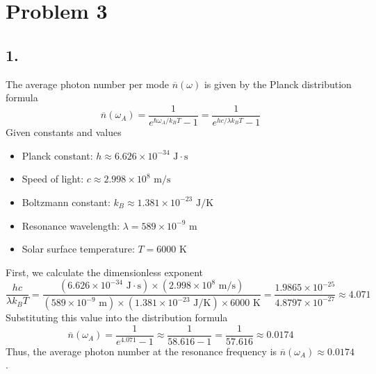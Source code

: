 \documentclass[11pt,a4paper]{article}
\begin{document}
\section*{Problem 3}

\subsection*{1.}
The average photon number per mode $\overline{n}(\omega)$ is given by the Planck distribution formula
\[
\overline{n}(\omega_A) = \frac{1}{e^{\hbar\omega_A / k_B T} - 1} = \frac{1}{e^{hc / \lambda k_B T} - 1}
\]
Given constants and values
\begin{itemize}
    \item Planck constant: $h \approx 6.626 \times 10^{-34}\text{ J}\cdot\text{s}$
    \item Speed of light: $c \approx 2.998 \times 10^8\text{ m/s}$
    \item Boltzmann constant: $k_B \approx 1.381 \times 10^{-23}\text{ J/K}$
    \item Resonance wavelength: $\lambda = 589 \times 10^{-9}\text{ m}$
    \item Solar surface temperature: $T = 6000\text{ K}$
\end{itemize}
First, we calculate the dimensionless exponent
\[
\frac{hc}{\lambda k_B T} = \frac{(6.626 \times 10^{-34}\text{ J}\cdot\text{s}) \times (2.998 \times 10^8\text{ m/s})}{(589 \times 10^{-9}\text{ m}) \times (1.381 \times 10^{-23}\text{ J/K}) \times 6000\text{ K}} = \frac{1.9865 \times 10^{-25}}{4.8797 \times 10^{-27}} \approx 4.071
\]
Substituting this value into the distribution formula
\[
\overline{n}(\omega_A) = \frac{1}{e^{4.071} - 1} \approx \frac{1}{58.616 - 1} = \frac{1}{57.616} \approx 0.0174
\]
Thus, the average photon number at the resonance frequency is $\overline{n}(\omega_A) \approx {0.0174}$.
\end{document}
